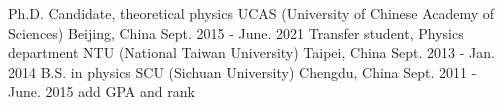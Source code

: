 

\begin{cventries}

    \cventry
        {Ph.D. Candidate, theoretical physics} %
        {UCAS (University of Chinese Academy of Sciences)} %
        {Beijing, China} %
        {Sept. 2015 - June. 2021} %
        {}
    \vspace{-2mm}
    \cventry
        {Transfer student, Physics department}
        {NTU (National Taiwan University)}
        {Taipei, China}
        {Sept. 2013 - Jan. 2014}
        {}
    \vspace{-2mm}
    \cventry
        {B.S. in physics}
        {SCU (Sichuan University)}
        {Chengdu, China}
        {Sept. 2011 - June. 2015}
        {add GPA and rank}

\end{cventries}
